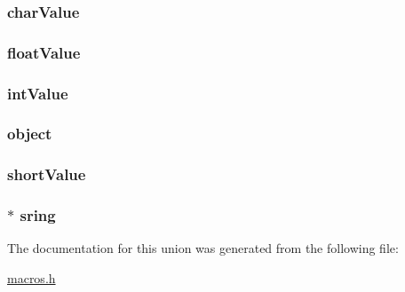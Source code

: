 \subsubsection[{char\+Value}]{ char\+Value}\label{union_variable__t_aba1116ae1f14241d7f7dedfa4274fd03}
\hypertarget{union_variable__t_ac559cbc67446421d60b499bf7951d951}{}
\subsubsection[{float\+Value}]{ float\+Value}\label{union_variable__t_ac559cbc67446421d60b499bf7951d951}
\hypertarget{union_variable__t_a7dc20c56214fe63b7a0832e3a37a8cc3}{}
\subsubsection[{int\+Value}]{ int\+Value}\label{union_variable__t_a7dc20c56214fe63b7a0832e3a37a8cc3}
\hypertarget{union_variable__t_a25c42d64ee27e6039892e1b101ee83d9}{}
\subsubsection[{object}]{ object}\label{union_variable__t_a25c42d64ee27e6039892e1b101ee83d9}
\hypertarget{union_variable__t_a9632f6ba24dab2f6881c6edd5cb62db5}{}
\subsubsection[{short\+Value}]{ short\+Value}\label{union_variable__t_a9632f6ba24dab2f6881c6edd5cb62db5}
\hypertarget{union_variable__t_a0c54d8fa8486a6551157f1a462848982}{}
\subsubsection[{sring}]{$\ast$ sring}\label{union_variable__t_a0c54d8fa8486a6551157f1a462848982}


The documentation for this union was generated from the following file\+:\begin{DoxyCompactItemize}
\item 
\hyperlink{macros_8h}{macros.\+h}\end{DoxyCompactItemize}
